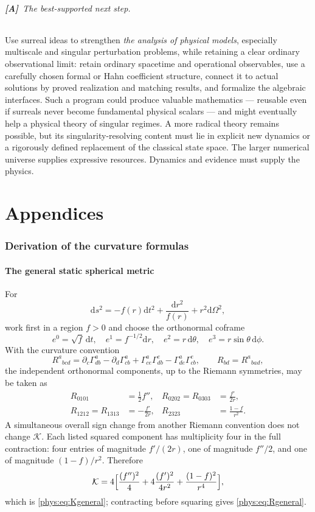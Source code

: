 \documentclass[11pt,letterpaper]{article}
\numberwithin{equation}{section}
\theoremstyle{definition}
\theoremstyle{remark}
\newcommand{\Kret}{\mathcal K}
\newcommand{\dd}{\mathrm d}
\newcommand{\TA}{\textcolor{TierA}{\textsf{\bfseries[A]}}}
\begin{document}
\paragraph{\TA\ The best-supported next step.}
Use surreal ideas to strengthen \emph{the analysis of physical models},
especially multiscale and singular perturbation problems, while retaining a
clear ordinary observational limit: retain ordinary spacetime and operational
observables, use a carefully chosen formal or Hahn coefficient structure,
connect it to actual solutions by proved realization and matching results, and
formalize the algebraic interfaces. Such a program could produce valuable
mathematics --- reusable even if surreals never become fundamental physical
scalars --- and might eventually help a physical theory of singular regimes. A
more radical theory remains possible, but its singularity-resolving content
must lie in explicit new dynamics or a rigorously defined replacement of the
classical state space. The larger numerical universe supplies expressive
resources. Dynamics and evidence must supply the physics.
\clearpage
\appendix
\part{Appendices}
\label{phys:part:app}

\section{Derivation of the curvature formulas}
\label{phys:app:curvature}

\subsection{The general static spherical metric}
\label{phys:app:sub:static}

For
\[
\dd s^{2}=-f(r)\dd t^{2}+\frac{\dd r^{2}}{f(r)}+r^{2}\dd\Omega^{2},
\]
work first in a region $f>0$ and choose the orthonormal coframe
\[
e^{0}=\sqrt f\,\dd t,\quad e^{1}=f^{-1/2}\dd r,\quad
e^{2}=r\,\dd\theta,\quad e^{3}=r\sin\theta\,\dd\phi .
\]
With the curvature convention
\begin{equation}\label{phys:eq:riemannconv}
R^{a}{}_{bcd}=\partial_{c}\Gamma^{a}_{db}-\partial_{d}\Gamma^{a}_{cb}
+\Gamma^{a}_{ce}\Gamma^{e}_{db}-\Gamma^{a}_{de}\Gamma^{e}_{cb},
\qquad R_{bd}=R^{a}{}_{bad},
\end{equation}
the independent orthonormal components, up to the Riemann symmetries, may be
taken as
\begin{align*}
R_{0101}&=\tfrac12 f'', &
R_{0202}=R_{0303}&=\frac{f'}{2r},\\
R_{1212}=R_{1313}&=-\frac{f'}{2r}, &
R_{2323}&=\frac{1-f}{r^{2}}.
\end{align*}
A simultaneous overall sign change from another Riemann convention does not
change $\Kret$. Each listed squared component has multiplicity four in the full
contraction: four entries of magnitude $f'/(2r)$, one of magnitude $f''/2$, and
one of magnitude $(1-f)/r^{2}$. Therefore
\[
\Kret=4\Bigl[\frac{(f'')^{2}}{4}+4\frac{(f')^{2}}{4r^{2}}
+\frac{(1-f)^{2}}{r^{4}}\Bigr],
\]
which is \eqref{phys:eq:Kgeneral}; contracting before squaring gives
\eqref{phys:eq:Rgeneral}.
\end{document}
